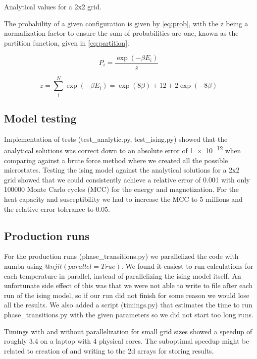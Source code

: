 \begin{table}[htp]
  \centering
  \caption{Analytical values for a 2x2 grid.}
  \label{tab:analytic}
\end{table}

The probability of a given configuration is given by \cref{eq:prob}, with
the z being a normalization factor to ensure the sum of probabilities are one,
known as the partition function, given in \cref{eq:partition}.


\begin{equation}
  \label{eq:prob}
  P_i = \frac{\exp(-\beta E_i)}{z}
\end{equation}

\begin{equation}
  \label{eq:partition}
  z = \sum_{i}^{N} \exp(-\beta E_i) = \exp(8\beta) + 12 + 2\exp(-8\beta)
\end{equation}

\subsection{Model testing}

Implementation of tests (test\_analytic.py, test\_ising.py) showed that the
analytical solutions was correct down to an absolute error of \num{1e-12}  when
comparing against a brute force method where we created all the possible
microstates.
Testing the ising model against the analytical solutions for a 2x2 grid showed
that we could consistently achieve a relative error of 0.001 with only 100000
Monte Carlo cycles (MCC) for the energy and magnetization. For the heat capacity
and susceptibility we had to increase the MCC to 5 millions and the relative
error tolerance to 0.05.


\subsection{Production runs}

For the production runs (phase\_transitions.py) we parallelized the code with
numba using $@njit(parallel=True)$. We found it easiest to run calculations for
each temperature in parallel, instead of parallelizing the ising model itself.
An unfortunate side effect of this was that we were not able to write to file
after each run of the ising model, so if our run did not finish for some reason
we would lose all the results.
We also added a script (timings.py) that estimates the time to run phase\_transitions.py
with the given parameters so we did not start too long runs.

Timings with and without parallelization for small grid sizes showed a speedup
of roughly 3.4 on a laptop with 4 physical cores. The suboptimal speedup might
be related to creation of and writing to the 2d arrays for storing results.
